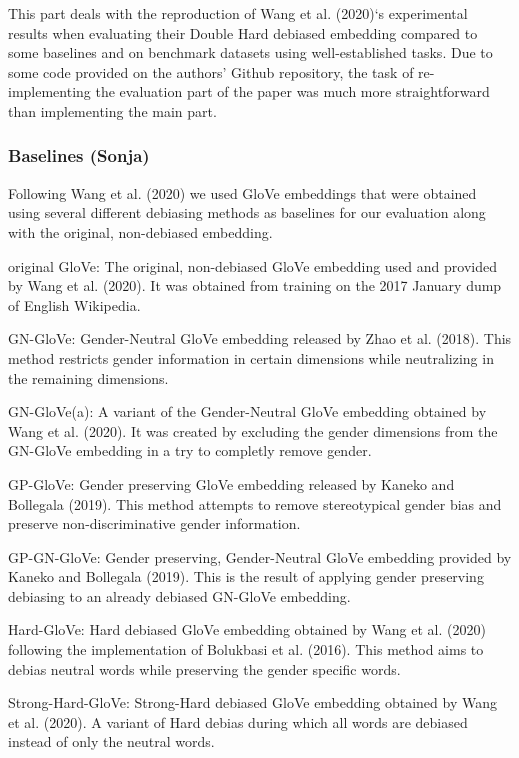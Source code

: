 \documentclass[
  english,
  man,floatsintext]{apa6}
\begin{document}
This part deals with the reproduction of Wang et al. (2020)`s experimental results when evaluating their Double Hard debiased embedding compared to some baselines and on benchmark datasets using well-established tasks. Due to some code provided on the authors' Github repository, the task of re-implementing the evaluation part of the paper was much more straightforward than implementing the main part.

\hypertarget{baselines-sonja}{%
\subsubsection{Baselines (Sonja)}\label{baselines-sonja}}

Following Wang et al. (2020) we used GloVe embeddings that were obtained using several different debiasing methods as baselines for our evaluation along with the original, non-debiased embedding.

original GloVe: The original, non-debiased GloVe embedding used and provided by Wang et al. (2020). It was obtained from training on the 2017 January dump of English Wikipedia.

GN-GloVe: Gender-Neutral GloVe embedding released by Zhao et al. (2018). This method restricts gender information in certain dimensions while neutralizing in the remaining dimensions.

GN-GloVe(a): A variant of the Gender-Neutral GloVe embedding obtained by Wang et al. (2020). It was created by excluding the gender dimensions from the GN-GloVe embedding in a try to completly remove gender.

GP-GloVe: Gender preserving GloVe embedding released by Kaneko and Bollegala (2019). This method attempts to remove stereotypical gender bias and preserve non-discriminative gender information.

GP-GN-GloVe: Gender preserving, Gender-Neutral GloVe embedding provided by Kaneko and Bollegala (2019). This is the result of applying gender preserving debiasing to an already debiased GN-GloVe embedding.

Hard-GloVe: Hard debiased GloVe embedding obtained by Wang et al. (2020) following the implementation of Bolukbasi et al. (2016). This method aims to debias neutral words while preserving the gender specific words.

Strong-Hard-GloVe: Strong-Hard debiased GloVe embedding obtained by Wang et al. (2020). A variant of Hard debias during which all words are debiased instead of only the neutral words.
\end{document}
